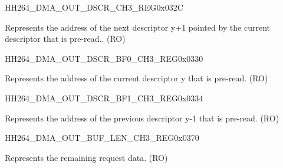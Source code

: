 \begin{register}{H}{H264\_DMA\_OUT\_DSCR\_CH3\_REG}{0x032C}\label{regdesc:H264DMAOUTDSCRCH3REG}
%
\regnewline%
\begin{regdesc}\begin{reglist}
\label{fielddesc:H264DMAOUTLINKDSCRCH3}\item [H264\_DMA\_OUTLINK\_DSCR\_CH3] Represents the address of the next descriptor y+1 pointed by the current descriptor that is pre-read.. (RO)
\end{reglist}\end{regdesc}
\end{register}


\begin{register}{H}{H264\_DMA\_OUT\_DSCR\_BF0\_CH3\_REG}{0x0330}\label{regdesc:H264DMAOUTDSCRBF0CH3REG}
%
\regnewline%
\begin{regdesc}\begin{reglist}
\label{fielddesc:H264DMAOUTLINKDSCRBF0CH3}\item [H264\_DMA\_OUTLINK\_DSCR\_BF0\_CH3] Represents the address of the current descriptor y that is pre-read. (RO)
\end{reglist}\end{regdesc}
\end{register}


\begin{register}{H}{H264\_DMA\_OUT\_DSCR\_BF1\_CH3\_REG}{0x0334}\label{regdesc:H264DMAOUTDSCRBF1CH3REG}
%
\regnewline%
\begin{regdesc}\begin{reglist}
\label{fielddesc:H264DMAOUTLINKDSCRBF1CH3}\item [H264\_DMA\_OUTLINK\_DSCR\_BF1\_CH3] Represents the address of the previous descriptor y-1 that is pre-read. (RO)
\end{reglist}\end{regdesc}
\end{register}

\begin{register}{H}{H264\_DMA\_OUT\_BUF\_LEN\_CH3\_REG}{0x0370}\label{regdesc:H264DMAOUTBUFLENCH3REG}
%
%
\regnewline%
\begin{regdesc}\begin{reglist}
\label{fielddesc:H264DMAOUTCMDFIFOBUFLENHBCH3}\item [H264\_DMA\_OUT\_CMDFIFO\_BUF\_LEN\_HB\_CH3] Represents the remaining request data. (RO)\end{reglist}\end{regdesc}
\end{register}


